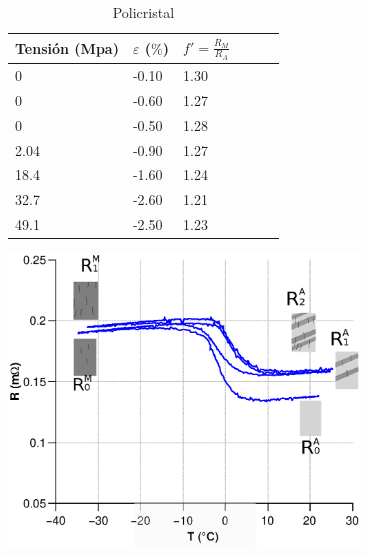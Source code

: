 \documentclass[usenames,dvipsnames]{beamer}
\begin{document}
\begin{frame}
\begin{multicols}{2}
 
\begin{table}
\tiny
\begin{center} 
\begin{tabular}{@{}llllll@{}} \toprule
Tensión (Mpa) & $\varepsilon$ ($\%$) &  $f'=\frac{R_M}{R_A}$\\ \midrule
 0        &  -0.10   & 1.30\\
 0       &  -0.60   & 1.27 \\
 0      &  -0.50   & 1.28 \\
 2.04      &  -0.90  & 1.27\\
 18.4    &  -1.60  & 1.24 \\
32.7      &  -2.60 & 1.21\\
 49.1     &  -2.50  & 1.23   \\
 \bottomrule
\end{tabular}
 \caption{Policristal}
\end{center}
\end{table}
 
\end{multicols}
 
 
\end{frame}


\begin{frame}

\includegraphics[width=0.7\textwidth]{img/resistencia/Histeresis2.eps}

\end{frame}
\end{document}
